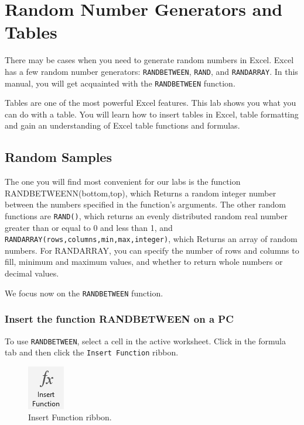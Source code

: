 \documentclass[
]{book}
\begin{document}
\hypertarget{number-gen}{%
\chapter{Random Number Generators and Tables}\label{number-gen}}

There may be cases when you need to generate random numbers in Excel. Excel has a few random number generators: \texttt{RANDBETWEEN}, \texttt{RAND}, and \texttt{RANDARRAY}. In this manual, you will get acquainted with the \texttt{RANDBETWEEN} function.

Tables are one of the most powerful Excel features. This lab shows you what you can do with a table. You will learn how to insert tables in Excel, table formatting and gain an understanding of Excel table functions and formulas.

\hypertarget{random-samples}{%
\section{Random Samples}\label{random-samples}}

The one you will find most convenient for our labs is the function RANDBETWEENN(bottom,top), which Returns a random integer number between the numbers specified in the function's arguments. The other random functions are \texttt{RAND()}, which returns an evenly distributed random real number greater than or equal to 0 and less than 1, and \texttt{RANDARRAY(rows,columns,min,max,integer)}, which Returns an array of random numbers. For RANDARRAY, you can specify the number of rows and columns to fill, minimum and maximum values, and whether to return whole numbers or decimal values.

We focus now on the \texttt{RANDBETWEEN} function.

\hypertarget{insert-the-function-randbetween-on-a-pc}{%
\subsection{Insert the function RANDBETWEEN on a PC}\label{insert-the-function-randbetween-on-a-pc}}

To use \texttt{RANDBETWEEN}, select a cell in the active worksheet. Click in the formula tab and then click the \texttt{Insert\ Function} ribbon.

\begin{figure}

{\centering \includegraphics[width=0.1\linewidth]{images/fx-pc} 

}

\caption{Insert Function ribbon.}\label{fig:function-button}
\end{figure}
\end{document}
